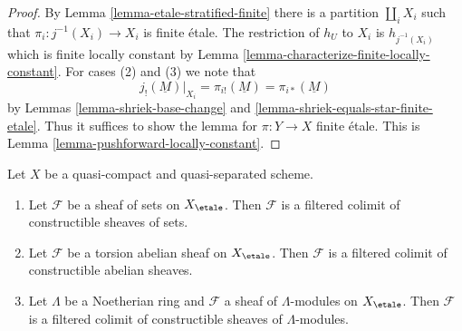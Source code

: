 \begin{proof}
By Lemma \ref{lemma-etale-stratified-finite} there is a partition
$\coprod_i X_i$ such that $\pi_i : j^{-1}(X_i) \to X_i$ is finite \'etale.
The restriction of $h_U$ to $X_i$ is $h_{j^{-1}(X_i)}$ which is finite
locally constant by Lemma \ref{lemma-characterize-finite-locally-constant}.
For cases (2) and (3) we note that
$$
j_!(\underline{M})|_{X_i} =
\pi_{i!}(\underline{M}) =
\pi_{i*}(\underline{M})
$$
by Lemmas \ref{lemma-shriek-base-change} and
\ref{lemma-shriek-equals-star-finite-etale}.
Thus it suffices to show the lemma for $\pi : Y \to X$ finite \'etale.
This is Lemma \ref{lemma-pushforward-locally-constant}.
\end{proof}

\begin{lemma}
\label{lemma-torsion-colimit-constructible}
Let $X$ be a quasi-compact and quasi-separated scheme.
\begin{enumerate}
\item Let $\mathcal{F}$ be a sheaf of sets on $X_\etale$.
Then $\mathcal{F}$ is a filtered colimit of constructible
sheaves of sets.
\item Let $\mathcal{F}$ be a torsion abelian sheaf on $X_\etale$.
Then $\mathcal{F}$ is a filtered colimit of constructible abelian sheaves.
\item Let $\Lambda$ be a Noetherian ring and $\mathcal{F}$ a sheaf
of $\Lambda$-modules on $X_\etale$. Then
$\mathcal{F}$ is a filtered colimit of constructible sheaves of
$\Lambda$-modules.
\end{enumerate}
\end{lemma}

